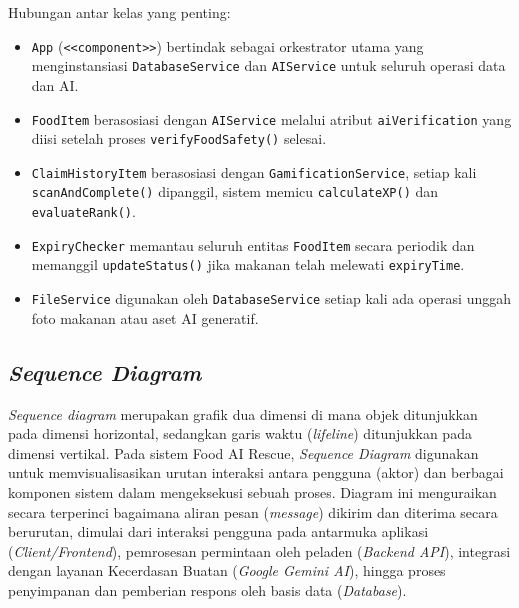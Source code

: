 \noindent Hubungan antar kelas yang penting:
\begin{itemize}
    \item \texttt{App} (\texttt{<<component>>}) bertindak sebagai orkestrator utama yang menginstansiasi \texttt{DatabaseService} dan \texttt{AIService} untuk seluruh operasi data dan AI.
    \item \texttt{FoodItem} berasosiasi dengan \texttt{AIService} melalui atribut \texttt{aiVerification} yang diisi setelah proses \texttt{verifyFoodSafety()} selesai.
    \item \texttt{ClaimHistoryItem} berasosiasi dengan \texttt{GamificationService}, setiap kali \texttt{scanAndComplete()} dipanggil, sistem memicu \texttt{calculateXP()} dan \texttt{evaluateRank()}.
    \item \texttt{ExpiryChecker} memantau seluruh entitas \texttt{FoodItem} secara periodik dan memanggil \texttt{updateStatus()} jika makanan telah melewati \texttt{expiryTime}.
    \item \texttt{FileService} digunakan oleh \texttt{DatabaseService} setiap kali ada operasi unggah foto makanan atau aset AI generatif.
\end{itemize}

\newpage
\begin{landscape}
\pagestyle{lscape}
    \centering
    \vfill
    
    \captionsetup{hypcap=false}
    \label{fig:class-diagram}
    \vfill
\end{landscape}
\pagestyle{fancy}
\newpage

\subsection{\textit{Sequence Diagram}}
\textit{Sequence diagram} merupakan grafik dua dimensi di mana objek ditunjukkan pada dimensi horizontal, sedangkan garis waktu (\textit{lifeline}) ditunjukkan pada dimensi vertikal. Pada sistem Food AI Rescue, \textit{Sequence Diagram} digunakan untuk memvisualisasikan urutan interaksi antara pengguna (aktor) dan berbagai komponen sistem dalam mengeksekusi sebuah proses. Diagram ini menguraikan secara terperinci bagaimana aliran pesan (\textit{message}) dikirim dan diterima secara berurutan, dimulai dari interaksi pengguna pada antarmuka aplikasi (\textit{Client/Frontend}), pemrosesan permintaan oleh peladen (\textit{Backend API}), integrasi dengan layanan Kecerdasan Buatan (\textit{Google Gemini AI}), hingga proses penyimpanan dan pemberian respons oleh basis data (\textit{Database}).


